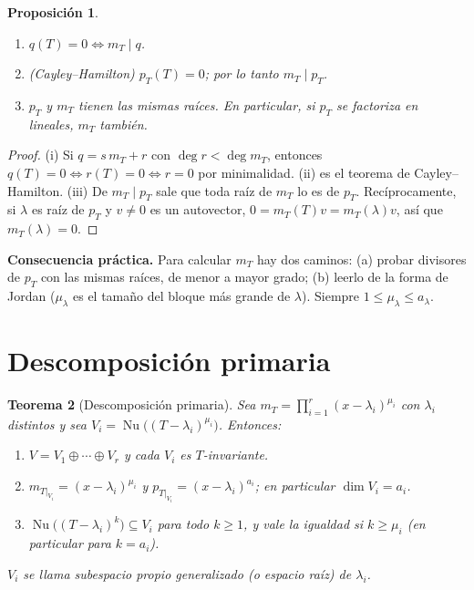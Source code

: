 \documentclass{article}
\DeclareMathOperator{\Nu}{Nu}
\theoremstyle{plain}
\newtheorem{teorema}{Teorema}[section]
\newtheorem{proposicion}[teorema]{Proposición}
\theoremstyle{definition}
\theoremstyle{remark}
\begin{document}
\begin{proposicion}\label{prop:minimal}
    \begin{enumerate}[label=(\roman*)]
        \item \(q(T)=0\iff m_T\mid q\).
        \item (Cayley--Hamilton) \(p_T(T)=0\); por lo tanto \(m_T\mid p_T\).
        \item \(p_T\) y \(m_T\) tienen las mismas raíces. En particular, si \(p_T\) se factoriza en lineales, \(m_T\) también.
    \end{enumerate}
\end{proposicion}
\begin{proof}
    (i) Si \(q=s\,m_T+r\) con \(\deg r<\deg m_T\), entonces \(q(T)=0\iff r(T)=0\iff r=0\) por minimalidad. (ii) es el teorema de Cayley--Hamilton. (iii) De \(m_T\mid p_T\) sale que toda raíz de \(m_T\) lo es de \(p_T\). Recíprocamente, si \(\lambda\) es raíz de \(p_T\) y \(v\ne0\) es un autovector, \(0=m_T(T)v=m_T(\lambda)v\), así que \(m_T(\lambda)=0\).
\end{proof}

\textbf{Consecuencia práctica.} Para calcular \(m_T\) hay dos caminos: (a) probar divisores de \(p_T\) con las mismas raíces, de menor a mayor grado; (b) leerlo de la forma de Jordan (\(\mu_\lambda\) es el tamaño del bloque más grande de \(\lambda\)). Siempre \(1\le\mu_\lambda\le a_\lambda\).

\section{Descomposición primaria}

\begin{teorema}[Descomposición primaria]\label{teo:primaria}
    Sea \(m_T=\prod_{i=1}^r(x-\lambda_i)^{\mu_i}\) con \(\lambda_i\) distintos y sea \(V_i=\Nu\big((T-\lambda_i)^{\mu_i}\big)\). Entonces:
    \begin{enumerate}[label=(\roman*)]
        \item \(V=V_1\oplus\cdots\oplus V_r\) y cada \(V_i\) es \(T\)-invariante.
        \item \(m_{T|_{V_i}}=(x-\lambda_i)^{\mu_i}\) y \(p_{T|_{V_i}}=(x-\lambda_i)^{a_i}\); en particular \(\dim V_i=a_i\).
        \item \(\Nu\big((T-\lambda_i)^k\big)\subseteq V_i\) para todo \(k\ge1\), y vale la igualdad si \(k\ge\mu_i\) (en particular para \(k=a_i\)).
    \end{enumerate}
    \(V_i\) se llama \emph{subespacio propio generalizado} (o espacio raíz) de \(\lambda_i\).
\end{teorema}
\end{document}
